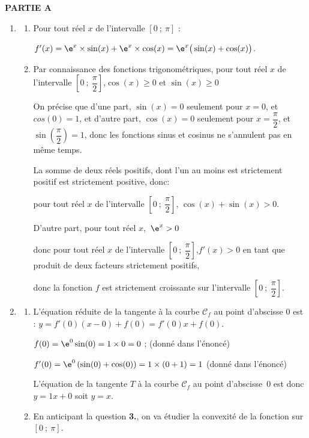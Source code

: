 \medskip

\textbf{PARTIE A}

\medskip

\begin{enumerate}
\item
	\begin{enumerate}
		\item Pour tout réel $x$ de l'intervalle $[0~;~\pi]$ :

$f'(x) = \e^x \times \sin(x) +\e^x \times  \cos(x) = \e^x \big( \sin(x) +\cos(x)\big)$.
		\item Par connaissance des fonctions trigonométriques, pour tout réel $x$ de l'intervalle $\left[0~;~\dfrac{\pi}{2}\right]$,\quad $\cos(x)\geqslant 0$ et $\sin(x)\geqslant 0$

On précise que d'une part, $\sin(x) = 0$ seulement pour $x = 0$, et $cos(0) = 1$, et d'autre part, $\cos(x) = 0$ seulement pour $x = \dfrac{\pi}{2}$, et $\sin\left(\dfrac{\pi}{2}\right)  =1$, donc les fonctions sinus et cosinus ne s'annulent pas en même temps.

La somme de deux réels positifs, dont l'un au moins est strictement positif est strictement positive, donc:

pour tout réel $x$ de l'intervalle $\left[0~;~\dfrac{\pi}{2}\right]$, \quad $\cos(x)+ \sin(x)> 0$.

D'autre part, pour tout réel $x$,\, $\e^{x} > 0$

donc pour tout réel $x$ de l'intervalle $\left[0~;~\dfrac{\pi}{2}\right]$,\quad $f'(x)> 0$ \quad en tant que produit de deux facteurs strictement positifs,

donc  la fonction $f$ est strictement croissante sur l'intervalle  $\left[0~;~\dfrac{\pi}{2}\right]$.
	\end{enumerate}
\item
	\begin{enumerate}
		\item L'équation réduite de la tangente à la courbe $\mathcal{C}_f$ au point d'abscisse 0 est : $y =f'(0)(x - 0) + f(0) = f'(0)x + f(0)$.

$f(0) = \e^0 \sin (0)= 1 \times 0= 0$ ; (donné dans l'énoncé)

$f'(0)= \e^0 \left( \sin(0) +\cos(0)\right) = 1 \times(0+1)=1$ (donné dans l'énoncé)

L'équation de la tangente $T$ à la courbe $\mathcal{C}_f$ au point d'abscisse~$0$ est donc $y = 1x + 0$ soit $y=x$.

		\item En anticipant la question \textbf{3.}, on va étudier la convexité de la fonction sur $[0 ~;~ \pi]$.


\end{enumerate}
\end{enumerate}
